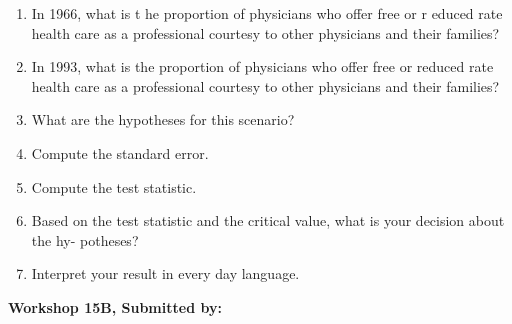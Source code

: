 \documentclass[11pt, chapterprefix=true]{scrbook}\usepackage[]{graphicx}\usepackage[]{color}
\begin{document}
\begin{exercises}
\begin{exercise}
\begin{enumerate} 
\item  In 1966, what is t he proportion of physicians who offer free or r educed rate health care as a professional courtesy to other physicians and their families?
\item  In 1993, what is the proportion of physicians who offer free or reduced rate health care as a professional courtesy to other physicians and their families?
\item  What are the hypotheses for this scenario?
\item  Compute the standard error.
\item  Compute the test statistic.
\item  Based on the test statistic and the critical value, what is your decision about the hy- potheses?
\item  Interpret your result in every day language.
\end{enumerate} 

\end{exercise}
\begin{solution}  %

\end{solution}

\clearpage

    \begin{exercise}  %

    \begin{center}
\begin{flushleft}\textbf{\large \hfill Workshop 15B, Submitted by: }\end{flushleft}

\end{center}


\end{exercise}
\end{exercises}
\end{document}
